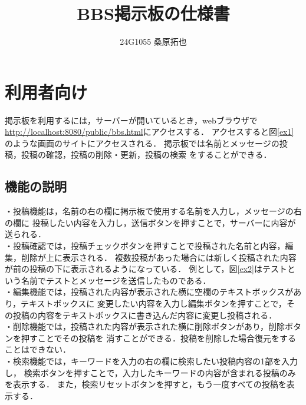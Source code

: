 \documentclass{jsarticle}
\title{BBS掲示板の仕様書}
\author{24G1055 桑原拓也}
\date{}
\begin{document}
\maketitle
\section*{利用者向け}
掲示板を利用するには，サーバーが開いているとき，webブラウザで
\url{http://localhost:8080/public/bbs.html}にアクセスする．
アクセスすると図\ref{ex1}のような画面のサイトにアクセスされる．
掲示板では名前とメッセージの投稿，投稿の確認，投稿の削除・更新，投稿の検索
をすることができる．
\subsection*{機能の説明}
\noindent
・投稿機能は，名前の右の欄に掲示板で使用する名前を入力し，メッセージの右の欄に
投稿したい内容を入力し，送信ボタンを押すことで，サーバーに内容が送られる．\\
・投稿確認では，投稿チェックボタンを押すことで投稿された名前と内容，編集，削除が上に表示される．
複数投稿があった場合には新しく投稿された内容が前の投稿の下に表示されるようになっている．
例として，図\ref{ex2}はテストという名前でテストとメッセージを送信したものである．\\
・編集機能では，投稿された内容が表示された横に空欄のテキストボックスがあり，テキストボックスに
変更したい内容を入力し編集ボタンを押すことで，その投稿の内容をテキストボックスに書き込んだ内容に変更し投稿される．\\
・削除機能では，投稿された内容が表示された横に削除ボタンがあり，削除ボタンを押すことでその投稿を
消すことができる．投稿を削除した場合復元をすることはできない．\\
・検索機能では，キーワードを入力の右の欄に検索したい投稿内容の1部を入力し，
検索ボタンを押すことで，入力したキーワードの内容が含まれる投稿のみを表示する．
また，検索リセットボタンを押すと，もう一度すべての投稿を表示する．
\end{document}
